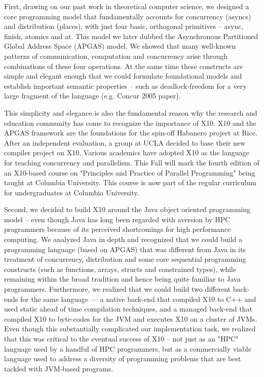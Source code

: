 First, drawing on our past work in theoretical computer science, we
designed a core programming model that fundamentally accounts for
concurrency (asyncs) and distribution (places), with just four basic,
orthogonal primitives -- async, finish, atomics and at. This model we
later dubbed the Asynchronous Partitioned Global Address Space (APGAS)
model. We showed that many well-known patterns of communication,
computation and concurrency arise through combinations of these four
operations. At the same time these constructs are simple and elegant
enough that we could formulate foundational models and establish
important semantic properties -- such as deadlock-freedom for a very
large fragment of the language (e.g. Concur 2005 paper).  

This simplicity and elegance is also the fundamental reason why the
research and education community has come to recognize the importance
of X10. X10 and the APGAS framework are the foundations for the
spin-off Habanero project at Rice. After an independent evaluation, a
group at UCLA decided to base their new compiler project on
X10. Various academics have adopted X10 as the language for teaching
concurrency and parallelism. This Fall will mark the fourth edition of
an X10-based course on "Principles and Practice of Parallel
Programming" being taught at Columbia University. This course is now
part of the regular curriculum for undergraduates at Columbia
University.  

Second, we decided to build X10 around the Java object oriented
programming model -- even though Java has long been regarded with
aversion by HPC programmers because of its perceived shortcomings for
high performance computing. We analyzed Java in depth and recognized
that we could build a programming language (based on APGAS) that was
different from Java in its treatment of concurrency, distribution and
some core sequential programming constructs (such as functions,
arrays, structs and constrained types), while remaining within the
broad tradition and hence being quite familiar to Java
programmers. Furthermore, we realized that we could build two
different back-ends for the same language --- a native back-end that
compiled X10 to C++ and used static ahead of time compilation
techniques, and a managed back-end that compiled X10 to byte-codes for
the JVM and executes X10 on a cluster of JVMs. Even though this
substantially complicated our implementation task, we realized that
this was critical to the eventual success of X10 -- not just as an
"HPC" language used by a handful of HPC programmers, but as a
commercially viable language used to address a diversity of
programming problems that are best tackled with JVM-based programs.  

